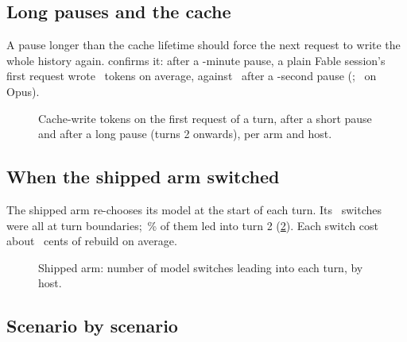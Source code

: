 \subsection{Long pauses and the cache}

A pause longer than the cache lifetime should force the next request to write the whole history again.
 confirms it: after a \LongGapMin-minute pause, a plain Fable session's first request wrote
\GapWriteFableLong\ tokens on average, against \GapWriteFableShort\ after a \ShortGapS-second pause
(\GapWriteFableX\X; \GapWriteOpusX\X\ on Opus).

\begin{figure}[htbp]
\centering
{}\par\smallskip

\caption{Cache-write tokens on the first request of a turn, after a short pause and after a long pause (turns 2
onwards), per arm and host.}
\label{fig:gapwrites}
\end{figure}

\subsection{When the shipped arm switched}

The shipped arm re-chooses its model at the start of each turn. Its \SwitchTotal\ switches were all at turn
boundaries; \SwitchTurnTwoPct\,\% of them led into turn 2 (\cref{fig:switch}). Each switch cost about
\RebuildPerSwitchCents\ cents of rebuild on average.

\begin{figure}[htbp]
\centering
{}\par\smallskip

\caption{Shipped arm: number of model switches leading into each turn, by host.}
\label{fig:switch}
\end{figure}

\FloatBarrier
\subsection{Scenario by scenario}

